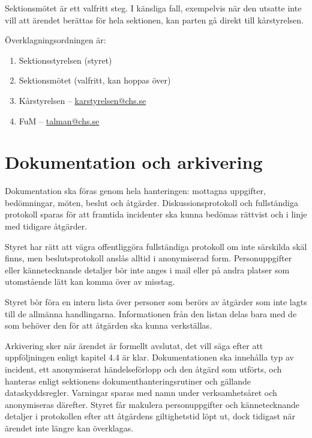 Sektionsmötet är ett valfritt steg. I känsliga fall, exempelvis när den utsatte inte vill att ärendet berättas för hela sektionen, kan parten gå direkt till kårstyrelsen.

Överklagningsordningen är:
\begin{enumerate}
\item Sektionsstyrelsen (styret)
\item Sektionsmötet (valfritt, kan hoppas över)
\item Kårstyrelsen -- \href{mailto:karstyrelsen@chs.se}{karstyrelsen@chs.se}
\item FuM -- \href{mailto:talman@chs.se}{talman@chs.se}
\end{enumerate}

\section{Dokumentation och arkivering}
Dokumentation ska föras genom hela hanteringen: mottagna uppgifter, bedömningar, möten, beslut och åtgärder. Diskussionsprotokoll och fullständiga protokoll sparas för att framtida incidenter ska kunna bedömas rättvist och i linje med tidigare åtgärder.

Styret har rätt att vägra offentliggöra fullständiga protokoll om inte särskilda skäl finns, men beslutsprotokoll anslås alltid i anonymiserad form. Personuppgifter eller kännetecknande detaljer bör inte anges i mail eller på andra platser som utomstående lätt kan komma över av misstag.

Styret bör föra en intern lista över personer som berörs av åtgärder som inte lagts till de allmänna handlingarna. Informationen från den listan delas bara med de som behöver den för att åtgärden ska kunna verkställas.

Arkivering sker när ärendet är formellt avslutat, det vill säga efter att uppföljningen enligt kapitel 4.4 är klar. Dokumentationen ska innehålla typ av incident, ett anonymiserat händelseförlopp och den åtgärd som utförts, och hanteras enligt sektionens dokumenthanteringsrutiner och gällande dataskyddsregler. Varningar sparas med namn under verksamhetsåret och anonymiseras därefter. Styret får makulera personuppgifter och kännetecknande detaljer i protokollen efter att åtgärdens giltighetstid löpt ut, dock tidigast när ärendet inte längre kan överklagas.

